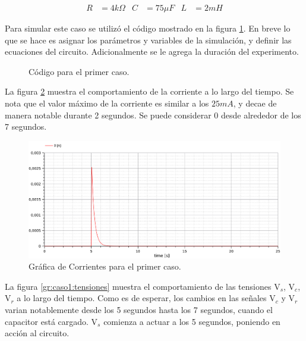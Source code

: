 
%
\begin{align*}
  R&=4k\Omega&
  C&=75\mu F&
  L&=2mH
\end{align*}

Para simular este caso se utilizó el código mostrado en la figura \ref{codigo:caso1}.
En breve lo que se hace es asignar los parámetros y variables de la simulación,
y definir las ecuaciones del circuito. Adicionalmente se le agrega la duración
del experimento.


\begin{figure}[H]
  
  \caption{Código para el primer caso.}
  \label{codigo:caso1}
\end{figure}

La figura \ref{gr:caso1:corrientes} muestra el comportamiento de la corriente
a lo largo del tiempo. Se nota que el valor máximo de la corriente es similar
a los $25mA$, y decae de manera notable durante 2 segundos. Se puede considerar
0 desde alrededor de los 7 segundos.

\begin{figure}[H]
  \centering
  \includegraphics[width=\textwidth]{modelica/graficas/1-corrientes}
  \caption{Gráfica de Corrientes para el primer caso.}
  \label{gr:caso1:corrientes}
\end{figure}

La figura \ref{gr:caso1:tensiones} muestra el comportamiento de las tensiones
$\text{V}_s$, $\text{V}_c$, $\text{V}_r$ a lo largo del tiempo. Como es de
esperar, los cambios en las señales $\text{V}_c$ y $\text{V}_r$ varian
notablemente desde los 5 segundos hasta los 7 segundos, cuando el capacitor
está cargado. $\text{V}_s$ comienza a actuar a los 5 segundos, poniendo en
acción al circuito.

